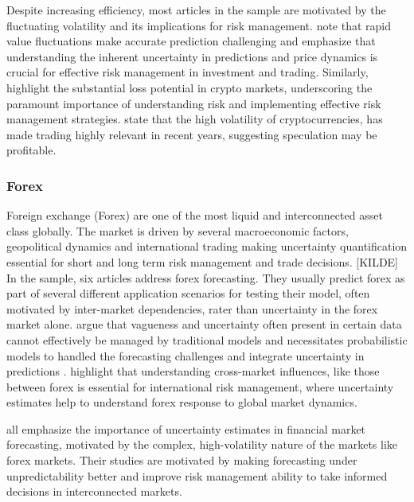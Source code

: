 Despite increasing efficiency, most articles in the sample are motivated by the fluctuating volatility and its implications for risk management. \cite{Golnari2024Cryptocurrency} note that rapid value fluctuations make accurate prediction challenging and emphasize that understanding the inherent uncertainty in predictions and price dynamics is crucial for effective risk management in investment and trading. Similarly, 
\cite{Almeida2024RiskForecasting} highlight the substantial loss potential in crypto markets, underscoring the paramount importance of understanding risk and implementing effective risk management strategies. \cite{cocco2021predictions} state that the high volatility of cryptocurrencies, has made trading highly relevant in recent years, suggesting speculation may be profitable. 


\subsubsection{Forex}
Foreign exchange (Forex) are one of the most liquid and interconnected asset class globally. The market is driven by several macroeconomic factors, geopolitical dynamics and international trading making uncertainty quantification essential for short and long term risk management and trade decisions. [KILDE]
In the sample, six articles address forex forecasting. They usually predict forex as part of several different application scenarios for testing their model, often motivated by inter-market dependencies, rater than uncertainty in the forex market alone. 
\cite{li2010stochastic} argue that vagueness and uncertainty often present in certain data cannot effectively be managed by traditional models and necessitates probabilistic models to handled the forecasting challenges and integrate uncertainty in predictions \parencite{Moller2007Uncertainty, li2010stochastic}. 
\cite{cao2019multi} highlight that understanding cross-market influences, like those between forex is essential for international risk management, where uncertainty estimates help to understand forex response to global market dynamics.  

\cite{Papaioannou2022gpr, Platanios2014gpr, 
tang2024period} all emphasize the importance of uncertainty estimates in financial market forecasting, motivated by the complex, high-volatility nature of the markets like forex markets. Their studies are motivated by making forecasting under unpredictability better and improve risk management ability to take informed decisions in interconnected markets.  


